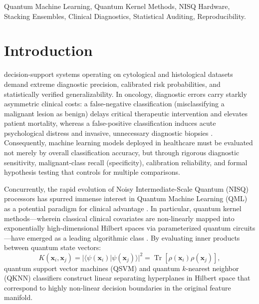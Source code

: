 \documentclass[journal,twocolumn]{IEEEtran}
\DeclareMathOperator{\Tr}{Tr}
\begin{document}
\begin{IEEEkeywords}
Quantum Machine Learning, Quantum Kernel Methods, NISQ Hardware, Stacking Ensembles, Clinical Diagnostics, Statistical Auditing, Reproducibility.
\end{IEEEkeywords}

\section{Introduction}
 decision-support systems operating on cytological and histological datasets demand extreme diagnostic precision, calibrated risk probabilities, and statistically verified generalizability. In oncology, diagnostic errors carry starkly asymmetric clinical costs: a false-negative classification (misclassifying a malignant lesion as benign) delays critical therapeutic intervention and elevates patient mortality, whereas a false-positive classification induces acute psychological distress and invasive, unnecessary diagnostic biopsies \cite{wolberg1990multisurface,street1993nuclear}. Consequently, machine learning models deployed in healthcare must be evaluated not merely by overall classification accuracy, but through rigorous diagnostic sensitivity, malignant-class recall (specificity), calibration reliability, and formal hypothesis testing that controls for multiple comparisons.

Concurrently, the rapid evolution of Noisy Intermediate-Scale Quantum (NISQ) processors has spurred immense interest in Quantum Machine Learning (QML) as a potential paradigm for clinical advantage \cite{preskill2018quantum,bharti2022noisy}. In particular, quantum kernel methods---wherein classical clinical covariates are non-linearly mapped into exponentially high-dimensional Hilbert spaces via parameterized quantum circuits---have emerged as a leading algorithmic class \cite{havlicek2019supervised,schuld2019quantum,huang2021power}. By evaluating inner products between quantum state vectors:
\begin{equation}
K(\mathbf{x}_i, \mathbf{x}_j) = |\langle \psi(\mathbf{x}_i) | \psi(\mathbf{x}_j) \rangle|^2 = \Tr[\rho(\mathbf{x}_i)\rho(\mathbf{x}_j)],
\label{eq:quantum_kernel_intro}
\end{equation}
quantum support vector machines (QSVM) and quantum $k$-nearest neighbor (QKNN) classifiers construct linear separating hyperplanes in Hilbert space that correspond to highly non-linear decision boundaries in the original feature manifold.
\end{document}
